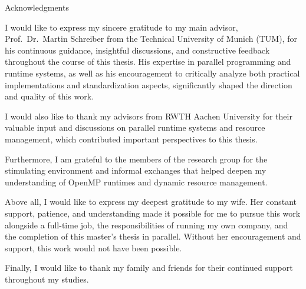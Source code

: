 \thispagestyle{empty}

\vspace*{20mm}

\begin{center}
    { Acknowledgments}
\end{center}

\vspace{10mm}

I would like to express my sincere gratitude to my main advisor, Prof.\ Dr.\ Martin Schreiber from the Technical University of Munich (TUM), for his continuous guidance, insightful discussions, and constructive feedback throughout the course of this thesis. His expertise in parallel programming and runtime systems, as well as his encouragement to critically analyze both practical implementations and standardization aspects, significantly shaped the direction and quality of this work.

I would also like to thank my advisors from RWTH Aachen University for their valuable input and discussions on parallel runtime systems and resource management, which contributed important perspectives to this thesis.

Furthermore, I am grateful to the members of the research group for the stimulating environment and informal exchanges that helped deepen my understanding of OpenMP runtimes and dynamic resource management.

Above all, I would like to express my deepest gratitude to my wife. Her constant support, patience, and understanding made it possible for me to pursue this work alongside a full-time job, the responsibilities of running my own company, and the completion of this master's thesis in parallel. Without her encouragement and support, this work would not have been possible.

Finally, I would like to thank my family and friends for their continued support throughout my studies.

\cleardoublepage{}
